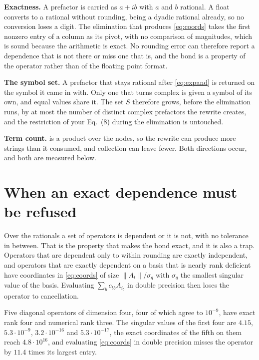 \documentclass[11pt,a4paper]{article}
\begin{document}
\textbf{Exactness.} A prefactor is carried as $a + ib$ with $a$ and $b$ rational. A float converts to
a rational without rounding, being a dyadic rational already, so no conversion loses a digit. The
elimination that produces \cref{eq:coords} takes the first nonzero entry of a column as its pivot,
with no comparison of magnitudes, which is sound because the arithmetic is exact. No rounding error
can therefore report a dependence that is not there or miss one that is, and the bond is a property
of the operator rather than of the floating point format.

\textbf{The symbol set.} A prefactor that stays rational after \cref{eq:expand} is returned on the
symbol it came in with. Only one that turns complex is given a symbol of its own, and equal values
share it. The set $S$ therefore grows, before the elimination runs, by at most the number of distinct
complex prefactors the rewrite creates, and the restriction of your Eq.~(8) during the elimination is
untouched.

\textbf{Term count.}  is a product over the nodes, so the rewrite can produce more
strings than it consumed, and collection can leave fewer. Both directions occur, and both are
measured below.

\section{When an exact dependence must be refused}\label{sec:refuse}

Over the rationals a set of operators is dependent or it is not, with no tolerance in between. That
is the property that makes the bond exact, and it is also a trap. Operators that are dependent only
to within rounding are exactly independent, and operators that are exactly dependent on a basis that
is nearly rank deficient have coordinates in \cref{eq:coords} of size $\lVert A_t\rVert / \sigma_q$
with $\sigma_q$ the smallest singular value of the basis. Evaluating $\sum_b c_{tb} A_{i_b}$ in
double precision then loses the operator to cancellation.

Five diagonal operators of dimension four, four of which agree to $10^{-9}$, have exact rank four
and numerical rank three. The singular values of the first four are $4.15$, $5.3\cdot 10^{-9}$,
$3.2\cdot 10^{-16}$ and $5.3\cdot 10^{-17}$, the exact coordinates of the fifth on them reach
$4.8\cdot 10^{16}$, and evaluating \cref{eq:coords} in double precision misses the operator by
$11.4$ times its largest entry.
\end{document}
